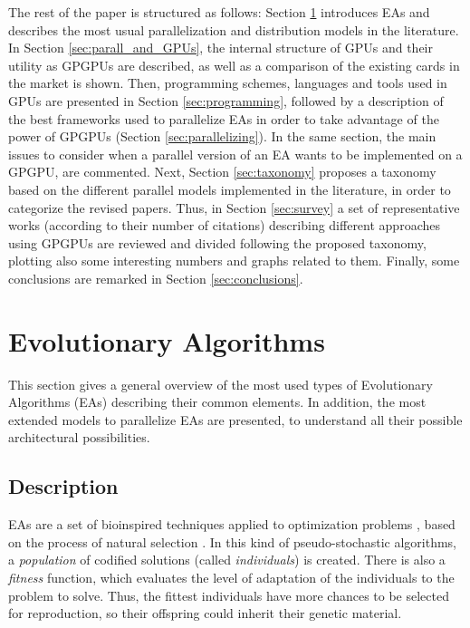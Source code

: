\documentclass{article}
\begin{document}
The rest of the paper is structured as follows:
Section \ref{sec:eas} introduces EAs and describes the most usual parallelization and distribution models in the literature.
In Section \ref{sec:parall_and_GPUs}, the internal structure of GPUs
and their utility as GPGPUs are described, as well as a
comparison of the existing cards in the market is shown.
Then, programming schemes, languages and tools used in GPUs are
presented in Section \ref{sec:programming}, followed by a description
of the best frameworks used to parallelize EAs in order to take
advantage of the power of GPGPUs (Section \ref{sec:parallelizing}). In
the same section, the main issues to consider when a parallel version of
an EA wants to be implemented on a GPGPU, are commented.
Next, Section \ref{sec:taxonomy} proposes a taxonomy based on the different parallel models implemented in the literature, in order to categorize the revised papers. Thus, in Section \ref{sec:survey} a set of representative works (according to their number of citations) describing different approaches using GPGPUs are reviewed and divided following the proposed taxonomy, plotting also some interesting numbers and graphs related to them.
Finally, some conclusions are remarked in Section \ref{sec:conclusions}.


\section{Evolutionary Algorithms}
\label{sec:eas}

This section gives a general overview of the most used types of Evolutionary Algorithms (EAs) describing their common elements. In addition, the most extended models to parallelize EAs are presented, to understand all their possible architectural possibilities.

\subsection{Description}
\label{subsec:eas-description}

EAs are a set of bioinspired techniques applied to optimization problems \cite{eiben2010whatis}, based on the process of natural selection \cite{darwin1859}. In this kind of pseudo-stochastic algorithms, a \textit{population} of codified solutions (called \textit{individuals}) is created. There is also a \textit{fitness} function, which evaluates the level of adaptation of the individuals to the problem to solve.
Thus, the fittest individuals have more chances to be selected for reproduction, so their offspring could inherit their genetic material.
\end{document}

